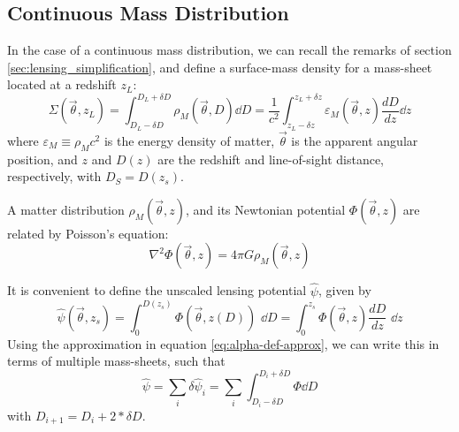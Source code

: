 \subsection{Continuous Mass Distribution}
In the case of a continuous mass distribution, we can recall the remarks of section \ref{sec:lensing_simplification}, and define a surface-mass density for a mass-sheet located at a redshift $z_L$:
\begin{equation}
  \label{eq:sigma-def}
  \Sigma(\vec{\theta},z_L) 
  = \int_{D_L-\delta D}^{D_L+\delta D}\rho_M(\vec{\theta},D)\dd D 
  = \frac{1}{c^2}\int_{z_L - \delta z}^{z_L + \delta z} 
  \varepsilon_M(\vec{\theta},z)\frac{dD}{dz}\dd z
\end{equation}
where $\varepsilon_M \equiv \rho_M c^2$ is the energy density of matter,
$\vec{\theta}$ is the apparent angular position, and $z$ and $D(z)$ are the 
redshift and line-of-sight distance, respectively, with $D_S = D(z_s)$.  

A matter distribution $\rho_M(\vec{\theta},z)$, and its Newtonian potential $\Phi(\vec{\theta},z)$ are related by Poisson's equation:
\begin{equation}
  \label{eq:poisson}
  \nabla^2 \Phi(\vec{\theta},z) = 4\pi G \rho_M(\vec{\theta},z)
\end{equation}

It is convenient to define the unscaled lensing potential $\hat{\psi}$, 
given by
\begin{equation}
  \hat{\psi}(\vec{\theta},z_s) 
  = \int_{0}^{D(z_s)} \Phi(\vec{\theta},z(D))\,\,\dd D 
  = \int_{0}^{z_s}\Phi(\vec{\theta},z)\frac{dD}{dz}\,\,\dd z
\end{equation}
Using the approximation in equation \ref{eq:alpha-def-approx}, we can write this in terms of multiple mass-sheets, such that
\begin{equation}
  \hat{\psi} = \sum_i \delta \hat{\psi}_i 
  = \sum_i \int_{D_i-\delta D}^{D_i+\delta D}\Phi \dd D
\end{equation}
with $D_{i+1} = D_i + 2*\delta D$.

